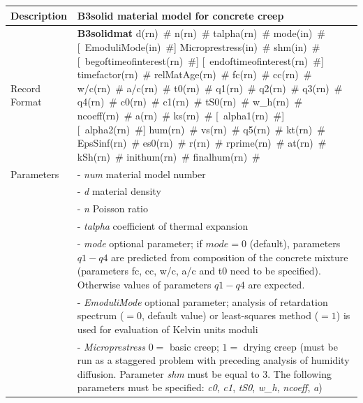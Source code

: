 \documentclass[a4paper]{article}
\newcommand{\descitem}[1]{{\noindent \bf #1}}
\newcommand{\elemparam}[2]{{{#1\tiny (#2)}~\#}}
\newcommand{\optelemparam}[2]{[{~\elemparam{#1}{#2}}]}
\newcommand{\param}[1]{{\it #1}}
\begin{document}
\begin{table}[!htb]
\begin{tabular}{|l|p{9cm}|}
\hline
Description & B3solid material model  for concrete creep\\
\hline
Record Format & \descitem{B3solidmat} 
\elemparam{d}{rn} \elemparam{n}{rn} \elemparam{talpha}{rn}
%
\elemparam{mode}{in} 
\optelemparam{EmoduliMode}{in} 
\elemparam{Microprestress}{in}
\elemparam{shm}{in} 
\optelemparam{begoftimeofinterest}{rn} \optelemparam{endoftimeofinterest}{rn} \elemparam{timefactor}{rn} \elemparam{relMatAge}{rn}
\elemparam{fc}{rn} \elemparam{cc}{rn} \elemparam{w/c}{rn} \elemparam{a/c}{rn} \elemparam{t0}{rn} %
\elemparam{q1}{rn} \elemparam{q2}{rn} \elemparam{q3}{rn} \elemparam{q4}{rn} %
%
\elemparam{c0}{rn} \elemparam{c1}{rn} \elemparam{tS0}{rn} %
\elemparam{w\_h}{rn} \elemparam{ncoeff}{rn} \elemparam{a}{rn}
%
\elemparam{ks}{rn} 
\optelemparam{alpha1}{rn} \optelemparam{alpha2}{rn} \elemparam{hum}{rn} \elemparam{vs}{rn}
\elemparam{q5}{rn} \elemparam{kt}{rn} \elemparam{EpsSinf}{rn}
\elemparam{es0}{rn} \elemparam{r}{rn} \elemparam{rprime}{rn} \elemparam{at}{rn}     
\elemparam{kSh}{rn}
\elemparam{inithum}{rn} \elemparam{finalhum}{rn}\\
%             
Parameters 
&- \param{num} material model number\\
&- \param{d} material density\\
&- \param{n} Poisson ratio\\
&- \param{talpha} coefficient of thermal expansion\\

&- \param{mode} optional parameter; if $mode = 0$ (default),  parameters $q1-q4$ are predicted from composition of the concrete mixture (parameters fc, cc, w/c, a/c and t0 need to be specified). Otherwise values of parameters $q1-q4$ are expected.\\
&- \param{EmoduliMode} optional parameter; analysis of retardation spectrum ($=0$, default value) or least-squares method ($=1$) is used for evaluation of Kelvin units moduli\\
&- \param{Microprestress} $0=$ basic creep; $1=$ drying creep (must be run as a staggered problem with preceding analysis of humidity diffusion. Parameter \param{shm} must be equal to 3. The following parameters must be specified: \param{c0}, \param{c1}, \param{tS0}, \param{w\_h}, \param{ncoeff}, \param{a})\\


\end{tabular}
\end{table}
\end{document}
